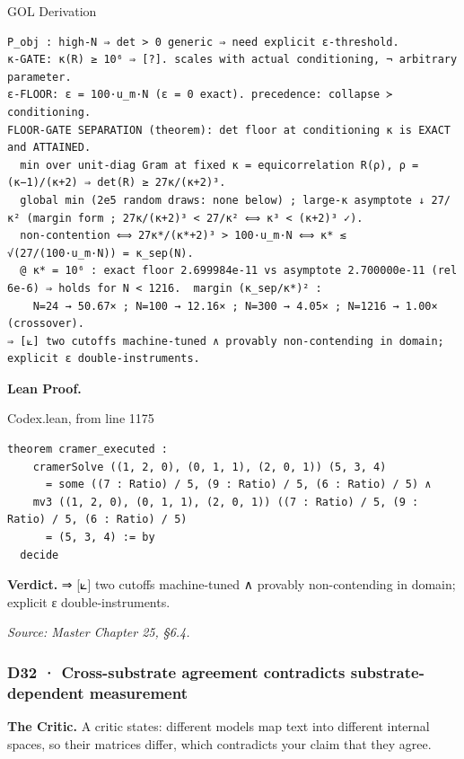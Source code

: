 \documentclass[10pt,twocolumn]{article}
\begin{document}
\begin{golbox}{GOL Derivation}
\begin{lstlisting}[style=golv]
P_obj : high-N ⇒ det > 0 generic ⇒ need explicit ε-threshold.
κ-GATE: κ(R) ≥ 10⁶ ⇒ [?]. scales with actual conditioning, ¬ arbitrary parameter.
ε-FLOOR: ε = 100·u_m·N (ε = 0 exact). precedence: collapse ≻ conditioning.
FLOOR-GATE SEPARATION (theorem): det floor at conditioning κ is EXACT and ATTAINED.
  min over unit-diag Gram at fixed κ = equicorrelation R(ρ), ρ = (κ−1)/(κ+2) ⇒ det(R) ≥ 27κ/(κ+2)³.
  global min (2e5 random draws: none below) ; large-κ asymptote ↓ 27/κ² (margin form ; 27κ/(κ+2)³ < 27/κ² ⟺ κ³ < (κ+2)³ ✓).
  non-contention ⟺ 27κ*/(κ*+2)³ > 100·u_m·N ⟺ κ* ≲ √(27/(100·u_m·N)) = κ_sep(N).
  @ κ* = 10⁶ : exact floor 2.699984e-11 vs asymptote 2.700000e-11 (rel 6e-6) ⇒ holds for N < 1216.  margin (κ_sep/κ*)² :
    N=24 → 50.67× ; N=100 → 12.16× ; N=300 → 4.05× ; N=1216 → 1.00× (crossover).
⇒ [⟀] two cutoffs machine-tuned ∧ provably non-contending in domain; explicit ε double-instruments.
\end{lstlisting}
\end{golbox}

\textbf{Lean Proof.}

\begin{leanexcerpt}{Codex.lean, from line 1175}
\begin{lstlisting}[style=leanx,firstnumber=1175]
theorem cramer_executed :
    cramerSolve ((1, 2, 0), (0, 1, 1), (2, 0, 1)) (5, 3, 4)
      = some ((7 : Ratio) / 5, (9 : Ratio) / 5, (6 : Ratio) / 5) ∧
    mv3 ((1, 2, 0), (0, 1, 1), (2, 0, 1)) ((7 : Ratio) / 5, (9 : Ratio) / 5, (6 : Ratio) / 5)
      = (5, 3, 4) := by
  decide
\end{lstlisting}
\end{leanexcerpt}

\textbf{Verdict.} ⇒ {[}⟀{]} two cutoffs machine-tuned ∧ provably
non-contending in domain; explicit ε double-instruments.

\emph{Source: Master Chapter 25, §6.4.}

\hypertarget{d32-cross-substrate-agreement-contradicts-substrate-dependent-measurement}{%
\subsubsection{D32 · Cross-substrate agreement contradicts
substrate-dependent
measurement}\label{d32-cross-substrate-agreement-contradicts-substrate-dependent-measurement}}

\textbf{The Critic.} A critic states: different models map text into
different internal spaces, so their matrices differ, which contradicts
your claim that they agree.
\end{document}
